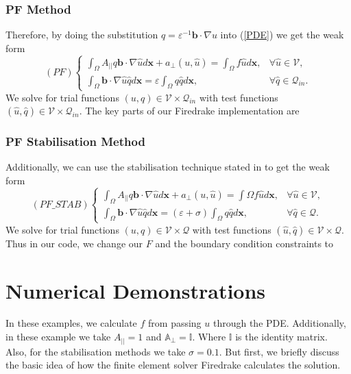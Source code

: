 \documentclass[12pt]{ociamthesis}
\begin{document}
\subsection{PF Method}
Therefore, by doing the substitution $q=\varepsilon^{-1} \mathbf{b} \cdot \nabla u$ into (\ref{PDE}) we get the weak form
\begin{equation} \label{PF_w}
(PF)
\begin{cases}
\int_{\Omega}A_{||}q\mathbf{b} \cdot \nabla \hat{u}  d\mathbf{x} + a_{\perp}(u, \hat{u}) 
= \int_{\Omega} f \hat{u} d\mathbf{x},
&\forall \hat{u} \in \mathcal{V},\\
\int_{\Omega}\mathbf{b} \cdot \nabla \hat{u}\hat{q} d\mathbf{x} 
= \varepsilon \int_{\Omega}q\hat{q} d \mathbf{x}, 
&\forall \hat{q} \in \mathcal{Q}_{in}.
\end{cases}
\end{equation}
We solve for trial functions $(u,q) \in \mathcal{V} \times \mathcal{Q}_{in}$ with test functions $(\hat{u}, \hat{q}) \in \mathcal{V} \times \mathcal{Q}_{in}$. The key parts of our  Firedrake \cite{Dragon} implementation are


\subsection{PF Stabilisation Method} \label{PF_STAB}
Additionally, we can use the stabilisation technique stated in \cite{STAB} to get the weak form
\begin{equation} \label{PF_STAB_w}
(PF\_STAB)
\begin{cases}
\int_{\Omega}A_{||}q\mathbf{b} \cdot \nabla \hat{u}  d\mathbf{x} + a_{\perp}(u, \hat{u}) 
= \int{\Omega} f \hat{u} d\mathbf{x},
&\forall \hat{u} \in \mathcal{V},\\
\int_{\Omega}\mathbf{b} \cdot \nabla \hat{u}\hat{q} d\mathbf{x} 
= (\varepsilon + \sigma)\int_{\Omega}q\hat{q} d \mathbf{x}, 
&\forall \hat{q} \in \mathcal{Q}.
\end{cases}
\end{equation}
We solve for trial functions $(u,q) \in \mathcal{V} \times \mathcal{Q}$ with test functions $(\hat{u}, \hat{q}) \in \mathcal{V} \times \mathcal{Q}$. Thus in our code, we change our $F$ and the boundary condition constraints to


\chapter{Numerical Demonstrations}
In these examples, we calculate $f$ from passing $u$ through the PDE. Additionally, in these example we take $A_{||}=1$ and $\mathbb{A}_{\perp} = \mathbb{I}$. Where $\mathbb{I}$ is the identity matrix. Also, for the stabilisation methods we take $\sigma=0.1$. But first, we briefly discuss the basic idea of how the finite element solver Firedrake \cite{Dragon} calculates the solution. 
\end{document}
